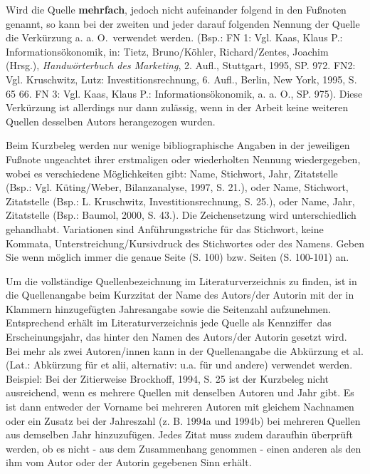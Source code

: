 \documentclass[a4paper, 12pt]{article}
\begin{document}
Wird die Quelle \textbf{mehrfach}, jedoch nicht aufeinander folgend in den Fu\ss noten
genannt, so kann bei der zweiten und jeder darauf folgenden Nennung der Quelle die
Verk\"{u}rzung \glqq a. a. O.\grqq\ verwendet werden. (Bsp.: FN 1: Vgl. Kaas, Klaus P.:
Informations\"{o}konomik, in: Tietz, Bruno/K\"{o}hler, Richard/Zentes, Joachim (Hrsg.),
\emph{Handw\"{o}rterbuch des Marketing}, 2. Aufl., Stuttgart, 1995, SP. 972. FN2: Vgl.
Kruschwitz, Lutz: Investitionsrechnung, 6. Aufl., Berlin, New York, 1995, S. 65 66.
FN 3: Vgl. Kaas, Klaus P.: Informations\"{o}konomik, a. a. O., SP. 975). Diese
Verk\"{u}rzung ist allerdings nur dann zul\"{a}ssig, wenn in der Arbeit keine weiteren
Quellen desselben Autors herangezogen wurden.

Beim Kurzbeleg werden nur wenige bibliographische Angaben in der jeweiligen Fu\ss note
ungeachtet ihrer erstmaligen oder wiederholten Nennung wiedergegeben, wobei es
verschiedene M\"{o}glichkeiten gibt: Name, Stichwort, Jahr, Zitatstelle (Bsp.: Vgl.
K\"{u}ting/Weber, Bilanzanalyse, 1997, S. 21.), oder Name, Stichwort, Zitatstelle (Bsp.:
L. Kruschwitz, Investitionsrechnung, S. 25.), oder Name, Jahr, Zitatstelle (Bsp.:
Baumol, 2000, S. 43.). Die Zeichensetzung wird unterschiedlich gehandhabt.
Variationen sind Anf\"{u}hrungsstriche f\"{u}r das Stichwort, keine Kommata,
Unterstreichung/Kursivdruck des Stichwortes oder des Namens. Geben Sie wenn m\"{o}glich
immer die genaue Seite (\glqq S. 100\grqq) bzw. Seiten (\glqq S. 100-101\grqq) an.

Um die vollst\"{a}ndige Quellenbezeichnung im Literaturverzeichnis zu finden, ist in die
Quellenangabe beim Kurzzitat der Name des Autors/der Autorin mit der in Klammern
hinzugef\"{u}gten Jahresangabe sowie die Seitenzahl aufzunehmen. Entsprechend erh\"{a}lt im
Literaturverzeichnis jede Quelle als \glqq Kennziffer\grqq\ das Erscheinungsjahr,
das hinter den Namen des Autors/der Autorin gesetzt wird. Bei mehr als zwei
Autoren/innen kann in der Quellenangabe die Abk\"{u}rzung et al. (Lat.: Abk\"{u}rzung f\"{u}r et
alii, alternativ: u.a. f\"{u}r \glqq und andere\grqq) verwendet werden. Beispiel: Bei
der Zitierweise Brockhoff, 1994, S. 25 ist der Kurzbeleg nicht ausreichend, wenn es
mehrere Quellen mit denselben Autoren und Jahr gibt. Es ist dann entweder der
Vorname bei mehreren Autoren mit gleichem Nachnamen oder ein Zusatz bei der
Jahreszahl (z. B. 1994a und 1994b) bei mehreren Quellen aus demselben Jahr
hinzuzuf\"{u}gen. Jedes Zitat muss zudem daraufhin \"{u}berpr\"{u}ft werden, ob es nicht - aus
dem Zusammenhang genommen - einen anderen als den ihm vom Autor oder der Autorin
gegebenen Sinn erh\"{a}lt.
\end{document}
